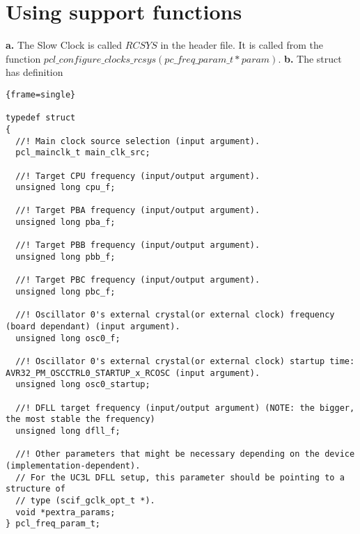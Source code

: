 \documentclass[10pt, a4paper]{article}
\begin{document}
\section{Using support functions}
\textbf{a.} The Slow Clock is called $RCSYS$ in the header file. It is called
from the function $pcl\_configure\_clocks\_rcsys(pc\_freq\_param\_t *param)$. \newline
\textbf{b.} The struct has definition
\begin{lstlisting}{frame=single}

typedef struct
{
  //! Main clock source selection (input argument).
  pcl_mainclk_t main_clk_src;

  //! Target CPU frequency (input/output argument).
  unsigned long cpu_f;

  //! Target PBA frequency (input/output argument).
  unsigned long pba_f;

  //! Target PBB frequency (input/output argument).
  unsigned long pbb_f;

  //! Target PBC frequency (input/output argument).
  unsigned long pbc_f;

  //! Oscillator 0's external crystal(or external clock) frequency (board dependant) (input argument).
  unsigned long osc0_f;

  //! Oscillator 0's external crystal(or external clock) startup time: AVR32_PM_OSCCTRL0_STARTUP_x_RCOSC (input argument).
  unsigned long osc0_startup;

  //! DFLL target frequency (input/output argument) (NOTE: the bigger, the most stable the frequency)
  unsigned long dfll_f;

  //! Other parameters that might be necessary depending on the device (implementation-dependent).
  // For the UC3L DFLL setup, this parameter should be pointing to a structure of
  // type (scif_gclk_opt_t *).
  void *pextra_params;
} pcl_freq_param_t;

\end{lstlisting}
\end{document}
